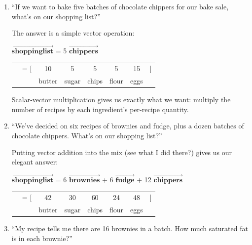 \begin{enumerate}
\itemsep1.5em
\item ``If we want to bake five batches of chocolate chippers for our bake sale,
what's on our shopping list?''

The answer is a simple vector operation:


\vspace{.2in}
$\overrightarrow{\textbf{shoppinglist}}$ = 5 
$\overrightarrow{\textbf{chippers}}$
\vspace{-.15in}
\begin{center}
\begin{tabular}{rlcccccc}
&\quad\quad= [ & 10 & 5 & 5 & 5 & 15 &] \\
&& \scriptsize{butter} & \scriptsize{sugar} & \scriptsize{chips} &
\scriptsize{flour} & \scriptsize{eggs} & \smallskip \\
\end{tabular}
\end{center}

Scalar-vector multiplication gives us exactly what we want: multiply the number
of recipes by each ingredient's per-recipe quantity.

\item ``We've decided on six recipes of brownies and fudge, plus a dozen
batches of chocolate chippers. What's on our shopping list?''
\label{shoppingListQuestion}

Putting vector addition into the mix (see what I did there?) gives us our
elegant answer:

\begin{center}
$\overrightarrow{\textbf{shoppinglist}}$ 
= 6 $\overrightarrow{\textbf{brownies}}$
+ 6 $\overrightarrow{\textbf{fudge}}$
+ 12 $\overrightarrow{\textbf{chippers}}$

\begin{tabular}{rlcccccc}
&\quad\quad\quad\quad  = [ & 42 & 30 & 60 & 24 & 48 &] \\
&& \scriptsize{butter} & \scriptsize{sugar} & \scriptsize{chips} &
\scriptsize{flour} & \scriptsize{eggs} & \smallskip \\
\end{tabular}
\end{center}

\item ``My recipe tells me there are 16 brownies in a batch. How much saturated
fat is in each brownie?''


\end{enumerate}
